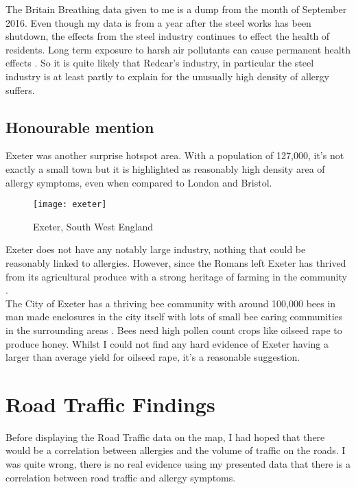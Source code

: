 The Britain Breathing data given to me is a dump from the month of September 2016. Even though my data is from a year after the steel works has been shutdown, the effects from the steel industry continues to effect the health of residents. Long term exposure to harsh air pollutants can cause permanent health effects \cite{longterm}. So it is quite likely that Redcar's industry, in particular the steel industry is at least partly to explain for the unusually high density of allergy suffers.\\

\subsection{Honourable mention}

Exeter was another surprise hotspot area. With a population of 127,000, it's not exactly a small town but it is highlighted as reasonably high density area of allergy symptoms, even when compared to London and Bristol.\\

\begin{figure}[H]
\begin{center}
\texttt{[image: exeter]}
\label{fig:exeter}
\caption{Exeter, South West England}
\end{center}
\end{figure}

Exeter does not have any notably large industry, nothing that could be reasonably linked to allergies. However, since the Romans left Exeter has thrived from its agricultural produce with a strong heritage of farming in the community \cite{oldexeter}.\\

The City of Exeter has a thriving bee community with around 100,000 bees in man made enclosures in the city itself with lots of small bee caring communities in the surrounding areas \cite{beeproj}. Bees need high pollen count crops like oilseed rape to produce honey. Whilst I could not find any hard evidence of Exeter having a larger than average yield for oilseed rape, it's a reasonable suggestion.

\section{Road Traffic Findings}

Before displaying the Road Traffic data on the map, I had hoped that there would be a correlation between allergies and the volume of traffic on the roads. I was quite wrong, there is no real evidence using my presented data that there is a correlation between road traffic and allergy symptoms.\\

